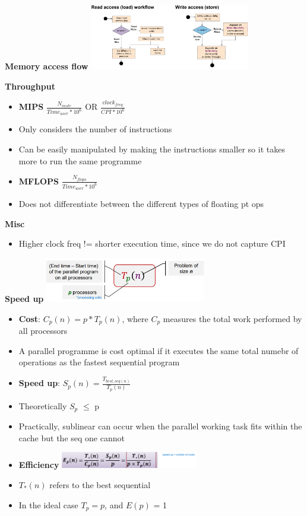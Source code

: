 \documentclass[10pt, landscape]{article}
\begin{document}
\begin{multicols}{4}
\textbf{Memory access flow}
\includegraphics*[width=7cm]{read_write}

\textbf{Throughput}
\begin{itemize}
    \item \textbf{MIPS} $\frac{N_{instr}}{Time_{user}*10^6}$ OR $\frac{clock_{freq}}{CPI*10^6}$
    \item Only considers the number of instructions 
    \item Can be easily manipulated by making the instructions smaller so it takes more to run the same programme 
    \item \textbf{MFLOPS} $\frac{N_{flops}}{Time_{user}*10^6}$
    \item Does not differentiate between the different types of floating pt ops 
\end{itemize}

\textbf{Misc}
\begin{itemize}
    \item Higher clock freq != shorter execution time, since we do not capture CPI 
\end{itemize}


\textbf{Speed up}
\includegraphics*[width=7cm]{t_p}
\begin{itemize}
    \item \textbf{Cost}: $C_{p}(n)=p*T_{p}(n)$, where $C_{p}$ measures the total work performed by all processors 
    \item A parallel programme is cost optimal if it executes the same total numebr of operations as the fastest sequential program 
    \item \textbf{Speed up}: $S_p(n)=\frac{T_{best\_seq(n)}}{T_p(n)}$
    \item Theoretically $S_p$ $\le$ p
    \item Practically, sublinear can occur when the parallel working task fits within the cache but the seq one cannot 
    \item \textbf{Efficiency}
    \includegraphics*[width=6cm]{efficiency}
    \item $T_*(n)$ refers to the best sequential
    \item In the ideal case $T_p=p$, and $E(p)$ = 1
\end{itemize}


\end{multicols}
\end{document}
